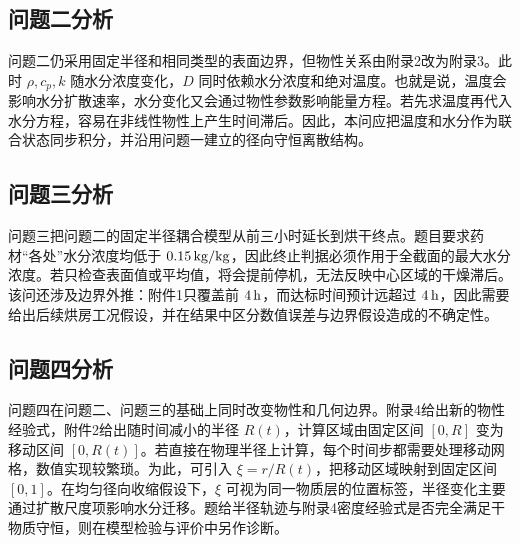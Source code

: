 \documentclass[UTF8,a4paper,12pt]{ctexart}
\numberwithin{equation}{section}
\begin{document}
\subsection{问题二分析}
问题二仍采用固定半径和相同类型的表面边界，但物性关系由附录2改为附录3。此时 $\rho,c_p,k$ 随水分浓度变化，$D$ 同时依赖水分浓度和绝对温度。也就是说，温度会影响水分扩散速率，水分变化又会通过物性参数影响能量方程。若先求温度再代入水分方程，容易在非线性物性上产生时间滞后。因此，本问应把温度和水分作为联合状态同步积分，并沿用问题一建立的径向守恒离散结构。

\subsection{问题三分析}
问题三把问题二的固定半径耦合模型从前三小时延长到烘干终点。题目要求药材“各处”水分浓度均低于 $0.15\rm\,kg/kg$，因此终止判据必须作用于全截面的最大水分浓度。若只检查表面值或平均值，将会提前停机，无法反映中心区域的干燥滞后。该问还涉及边界外推：附件1只覆盖前 $4\rm\,h$，而达标时间预计远超过 $4\rm\,h$，因此需要给出后续烘房工况假设，并在结果中区分数值误差与边界假设造成的不确定性。

\subsection{问题四分析}
问题四在问题二、问题三的基础上同时改变物性和几何边界。附录4给出新的物性经验式，附件2给出随时间减小的半径 $R(t)$，计算区域由固定区间 $[0,R]$ 变为移动区间 $[0,R(t)]$。若直接在物理半径上计算，每个时间步都需要处理移动网格，数值实现较繁琐。为此，可引入 $\xi=r/R(t)$，把移动区域映射到固定区间 $[0,1]$。在均匀径向收缩假设下，$\xi$ 可视为同一物质层的位置标签，半径变化主要通过扩散尺度项影响水分迁移。题给半径轨迹与附录4密度经验式是否完全满足干物质守恒，则在模型检验与评价中另作诊断。
\end{document}
